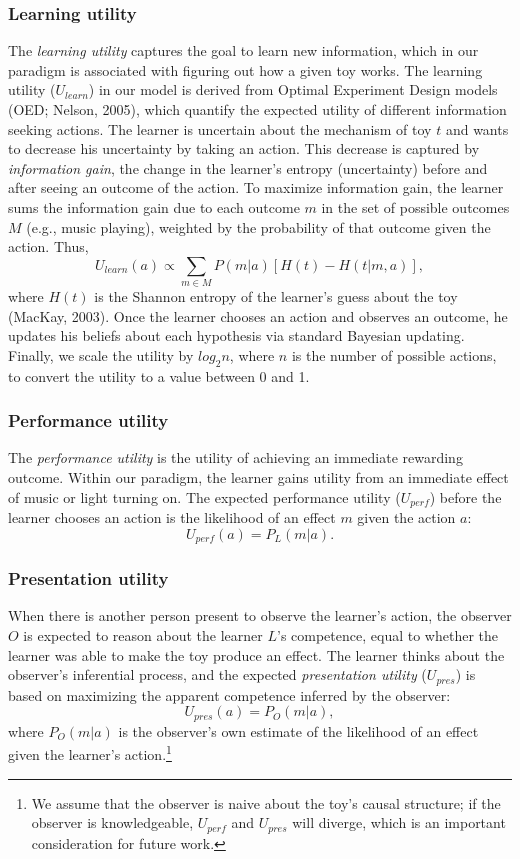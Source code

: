 \documentclass[10pt, letterpaper]{article}
\begin{document}
\subsubsection{Learning utility}\label{learning-utility}

The \emph{learning utility} captures the goal to learn new information,
which in our paradigm is associated with figuring out how a given toy
works. The learning utility (\(U_{learn}\)) in our model is derived from
Optimal Experiment Design models (OED; Nelson, 2005), which quantify the
expected utility of different information seeking actions. The learner
is uncertain about the mechanism of toy \(t\) and wants to decrease his
uncertainty by taking an action. This decrease is captured by
\emph{information gain}, the change in the learner's entropy
(uncertainty) before and after seeing an outcome of the action. To
maximize information gain, the learner sums the information gain due to
each outcome \(m\) in the set of possible outcomes \(M\) (e.g., music
playing), weighted by the probability of that outcome given the action.
Thus,
\[ U_{learn}(a) \propto \sum_{m \in M}{P(m|a)}[{H(t) - H(t | m,a)}],\]
\noindent
where \(H(t)\) is the Shannon entropy of the learner's guess about the
toy (MacKay, 2003). Once the learner chooses an action and observes an
outcome, he updates his beliefs about each hypothesis via standard
Bayesian updating. Finally, we scale the utility by \(log_2n\), where
\(n\) is the number of possible actions, to convert the utility to a
value between 0 and 1.

\subsubsection{Performance utility}\label{performance-utility}

The \emph{performance utility} is the utility of achieving an immediate
rewarding outcome. Within our paradigm, the learner gains utility from
an immediate effect of music or light turning on. The expected
performance utility (\(U_{perf}\)) before the learner chooses an action
is the likelihood of an effect \(m\) given the action \(a\):
\[ U_{perf}(a) = P_L(m | a).\] \noindent

\subsubsection{Presentation utility}\label{presentation-utility}

When there is another person present to observe the learner's action,
the observer \(O\) is expected to reason about the learner \(L\)'s
competence, equal to whether the learner was able to make the toy
produce an effect. The learner thinks about the observer's inferential
process, and the expected \emph{presentation utility} (\(U_{pres}\)) is
based on maximizing the apparent competence inferred by the observer:
\[ U_{pres}(a) = P_O(m | a),\] \noindent
where \(P_O(m | a)\) is the observer's own estimate of the likelihood of
an effect given the learner's action.\footnote{We assume that the
  observer is naive about the toy's causal structure; if the observer is
  knowledgeable, \(U_{perf}\) and \(U_{pres}\) will diverge, which is an
  important consideration for future work.}
\end{document}
